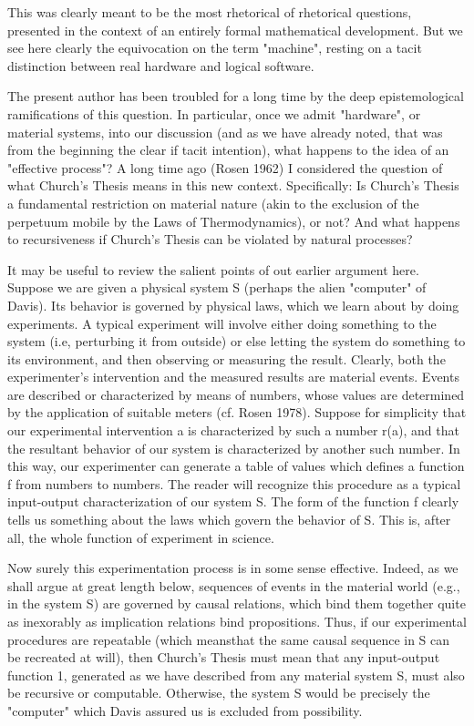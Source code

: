 \documentclass[a4paper,12pt]{article}
\begin{document}
This was clearly meant to be the most rhetorical of rhetorical questions, presented in the context of an entirely formal mathematical development.
But we see here clearly the equivocation on the term "machine", resting on a tacit distinction between real hardware and logical software.

The present author has been troubled for a long time by the deep epistemological ramifications of this question.  In particular,
once we admit "hardware", or material systems, into our discussion (and as we have already noted, that was from the beginning the clear if tacit intention),
what happens to the idea of an "effective process"?  A long time ago (Rosen 1962) I considered the question of what Church's Thesis
means in this new context. Specifically: Is Church's Thesis a fundamental restriction on material nature (akin to the exclusion of the perpetuum
mobile by the Laws of Thermodynamics), or not? And what happens to recursiveness if Church's Thesis can be violated by natural processes?

It may be useful to review the salient points of out earlier argument here. Suppose we are given a physical system S (perhaps the alien "computer" of Davis).
Its behavior is governed by physical laws, which we learn about by doing experiments. A typical experiment will involve either doing something to the system
(i.e, perturbing it from outside) or else letting the system do something to its environment, and then observing or measuring the result.
Clearly, both the experimenter's intervention and the measured results are material events. Events are described or characterized by means of
numbers, whose values are determined by the application of suitable meters (cf. Rosen 1978). Suppose for simplicity that our experimental
intervention a is characterized by such a number r(a), and that the resultant behavior of our system is characterized by another such number.
In this way, our experimenter can generate a table of values which defines a function f from numbers to numbers. The reader will recognize
this procedure as a typical input-output characterization of our system S.  The form of the function f clearly tells us something about the laws
which govern the behavior of S. This is, after all, the whole function of experiment in science.

Now surely this experimentation process is in some sense effective. Indeed, as we shall argue at great length below, sequences of events in the
material world (e.g., in the system S) are governed by causal relations, which bind them together quite as inexorably as implication relations
bind propositions. Thus, if our experimental procedures are repeatable (which meansthat the same causal sequence in S can be recreated at will),
then Church's Thesis must mean that any input-output function 1, generated as we have described from any material system S,
must also be recursive or computable. Otherwise, the system S would be precisely the "computer" which Davis assured us is excluded from possibility.
\end{document}
